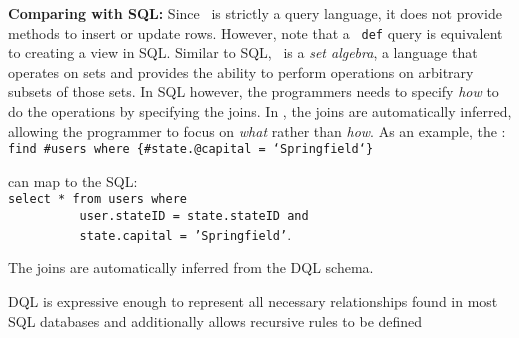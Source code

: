 \textbf{Comparing with SQL:} Since \dsl~is strictly a query language, it does not provide methods to insert or update rows. However, note that a \dsl~\texttt{def} query is 
equivalent to creating a view in SQL. Similar to SQL, \dsl~is a {\em set algebra}, a language that operates on sets and provides the ability to perform operations on arbitrary subsets of those sets. In SQL however, the programmers needs to specify {\em how} to do the operations by specifying the joins. In \dsl, the joins are automatically inferred, allowing the programmer to focus on {\em what} rather than {\em how}. As an example, the \dsl:\\
\texttt{\phantom{~}find \#users where \{\#state.@capital = `Springfield`\}} 

can map to the SQL:\\
\texttt{\phantom{~}select * from users where }\\
\texttt{\phantom{~}~~~~~~~~~~user.stateID = state.stateID and}\\
\texttt{\phantom{~}~~~~~~~~~~state.capital = 'Springfield'}.

The joins are automatically inferred from the DQL schema.

DQL is expressive enough to represent all necessary relationships found in most SQL databases and additionally allows recursive rules to be defined 


 
%


